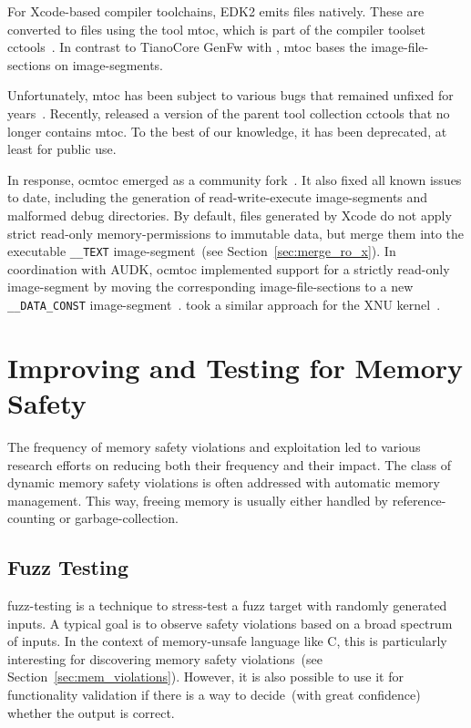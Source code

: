 For Xcode-based compiler toolchains, \gls{EDK2} emits  files natively. These are converted to  files using the  tool mtoc, which is part of the  compiler toolset cctools~\cite{apple-cctools}. In contrast to TianoCore GenFw with , mtoc bases the  \glspl{image-file-section} on  \glspl{image-segment}.

Unfortunately, mtoc has been subject to various bugs that remained unfixed for years~\cite{ocmtoc}. Recently,  released a version of the parent tool collection cctools that no longer contains mtoc. To the best of our knowledge, it has been deprecated, at least for public use.

In response, ocmtoc emerged as a community fork~\cite{ocmtoc}. It also fixed all known issues to date, including the generation of read-write-execute \glspl{image-segment} and malformed debug directories. By default,  files generated by Xcode do not apply strict read-only \glspl{memory-permission} to immutable data, but merge them into the executable \texttt{\_\_TEXT} \gls{image-segment}~(see Section~\ref{sec:merge_ro_x}). In coordination with \gls{AUDK}, ocmtoc implemented support for a strictly read-only \gls{image-segment} by moving the corresponding \glspl{image-file-section} to a new \texttt{\_\_DATA\_CONST} \gls{image-segment}~\cite{audk,ocmtoc}.  took a similar approach for the XNU kernel~\cite{xnu}.

\section{Improving and Testing for Memory Safety}


The frequency of memory safety violations and exploitation led to various research efforts on reducing both their frequency and their impact. The class of dynamic memory safety violations is often addressed with automatic memory management. This way, freeing memory is usually either handled by \gls{reference-counting} or \gls{garbage-collection}.

\subsection{Fuzz Testing}

\gls{fuzz-testing} is a technique to stress-test a fuzz target with randomly generated inputs. A typical goal is to observe safety violations based on a broad spectrum of inputs. In the context of memory-unsafe language like \gls{C}, this is particularly interesting for discovering memory safety violations~(see Section~\ref{sec:mem_violations}). However, it is also possible to use it for functionality validation if there is a way to decide~(with great confidence) whether the output is correct.

